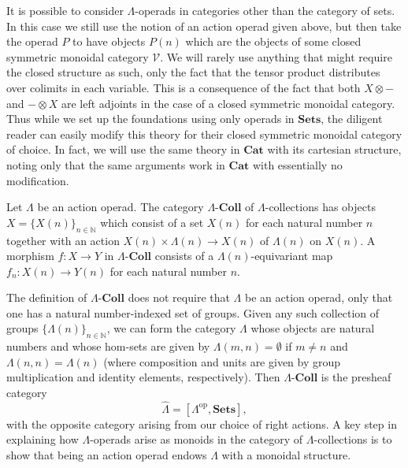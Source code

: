\documentclass{amsbook} %
\newcommand{\mb}{\mathbf}
\newcommand{\N}{\mathbb{N}}
\numberwithin{section}{chapter}
\begin{document}
\begin{rem}
It is possible to consider $\Lambda$-operads in categories other than the category of sets.  In this case we still use the notion of an action operad given above, but then take the operad $P$ to have objects $P(n)$ which are the objects of some closed symmetric monoidal category $\mathcal{V}$.  We will rarely use anything that might require the closed structure as such, only the fact that the tensor product distributes over colimits in each variable.  This is a consequence of the fact that both $X \otimes -$ and $- \otimes X$ are left adjoints in the case of a closed symmetric monoidal category.  Thus while we set up the foundations using only operads in $\mb{Sets}$, the diligent reader can easily modify this theory for their closed symmetric monoidal category of choice.  In fact, we will use the same theory in $\mb{Cat}$ with its cartesian structure, noting only that the same arguments work in $\mb{Cat}$ with essentially no modification.
\end{rem}

\begin{Defi}
Let $\Lambda$ be an action operad.  The category $\Lambda\mb{\mbox{-}Coll}$ of $\Lambda$-collections has objects $X = \{ X(n) \}_{n \in \N}$ which consist of a set $X(n)$ for each natural number $n$ together with an action $X(n) \times \Lambda(n) \rightarrow X(n)$ of $\Lambda(n)$ on $X(n)$.  A morphism $f:X \rightarrow Y$ in $\Lambda\mb{\mbox{-}Coll}$ consists of a $\Lambda(n)$-equivariant map $f_{n}:X(n) \rightarrow Y(n)$ for each natural number $n$.
\end{Defi}

\begin{rem}
The definition of $\Lambda\mb{\mbox{-}Coll}$ does not require that $\Lambda$ be an action operad, only that one has a natural number-indexed set of groups.  Given any such collection of groups $\{ \Lambda(n) \}_{n \in \N}$, we can form the category $\mathbb{\Lambda}$ whose objects are natural numbers and whose hom-sets are given by $\mathbb{\Lambda}(m,n) = \emptyset$ if $m \neq n$ and $\mathbb{\Lambda}(n,n) = \Lambda(n)$ (where composition and units are given by group multiplication and identity elements, respectively).  Then $\Lambda\mb{\mbox{-}Coll}$ is the presheaf category
\[
\hat{\mathbb{\Lambda}} = [\mathbb{\Lambda}^{\textrm{op}}, \mb{Sets}],
 \]
with the opposite category arising from our choice of right actions.  A key step in explaining how $\Lambda$-operads arise as monoids in the category of $\Lambda$-collections is to show that being an action operad endows $\mathbb{\Lambda}$ with a monoidal structure.
\end{rem}
\end{document}
